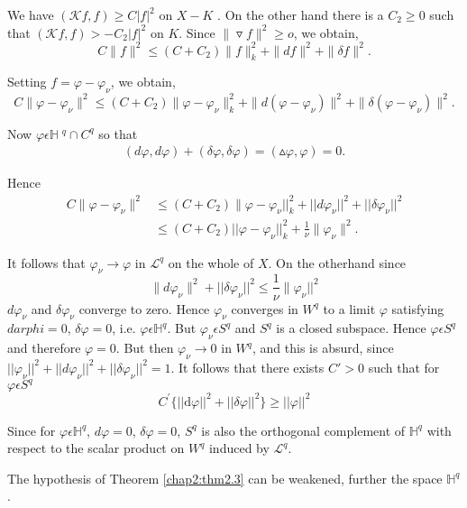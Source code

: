 We have $(\mathcal{K} f,f) \geq C | f|^2$ on $X-K$ . On the
other hand there is a $C_2 \geq 0$ such that $(\mathcal{K}
f,f)>-C_2| f|^2$ on $K$. Since $\| \triangledown f \|^2 \geq o$, we obtain, 
$$
C\| f\|^2 \leq (C+C_2)\| f \|^2_{k}+\| df\|^2 + \| \delta f\|^2.
$$

Setting $f = \varphi - \varphi_\nu$, we obtain,
$$
C\|\varphi-\varphi_\nu\|^2 \leq
(C+C_2)\|\varphi-\varphi_\nu\|^2_{k}+\|d(\varphi-\varphi_\nu)\|^2 + \|
\delta(\varphi-\varphi_\nu)\|^2 .
$$
 
Now $\varphi \epsilon \mathbb{H} \;{}^q\cap C^q$ so that  
\begin{gather*}
  (d \varphi, d\varphi) + (\delta \varphi,\delta
  \varphi)=(\vartriangle \varphi,\varphi)=0.
\end{gather*}

Hence
\begin{align*}
  C\|\varphi-\varphi_\nu\|^2 &\leq(C+C_2)\|\varphi-\varphi_\nu||^2_k
  +|| d \varphi_\nu ||^2 + || \delta \varphi_\nu ||^2 \\ 
  & \leq (C + C_2) || \varphi - \varphi_\nu||^2_{k}
  +\frac{1}{\nu}\|\varphi_\nu\|^2 . 
\end{align*}

It follows that $\varphi_\nu \rightarrow \varphi$ in $\mathcal{L}^q$ on
the whole of $X$. On the other\pageoriginale hand since
$$
\| d \varphi_\nu \|^2 + ||\delta \varphi_\nu ||^2 \leq
\frac{1}{\nu}\|\varphi_\nu||^2 
$$
$d\varphi_\nu$ and $\delta \varphi_\nu$ converge to zero. Hence
   $\varphi_\nu $ converges in $W^q$ to a limit $\varphi$ satisfying
   $d arphi=0$, $\delta\varphi=0$, i.e. $\varphi\epsilon
   \mathbb{H}^q$. But $\varphi_\nu \epsilon S^q$ and $S^q$ is a closed
   subspace. Hence $\varphi\epsilon S^q$ and therefore
   $\varphi=0$. But then $\varphi_\nu \rightarrow 0$ in $W^q$, and
   this is absurd, since $||\varphi_\nu||^2 + || d
   \varphi_\nu||^2 +||\delta \varphi_\nu||^2=1$. It follows that there
   exists $C'>0$ such that for $\varphi \epsilon S^q$ 
   $$
   C^{'}\{|| \text{d} \varphi||^2 + ||\delta \varphi||^2 \}\geq
   ||\varphi||^2
   $$

\begin{remark*}
  Since for $\varphi \epsilon \mathbb{H}^q$, $d\varphi=0$, $\delta
  \varphi = 0$, $S^q$ is also the orthogonal complement of
  $\mathbb{H}^q$ with respect to the scalar product on $W^q$ induced 
  by $\mathcal{L}^q$. 
\end{remark*}

The hypothesis of Theorem \ref{chap2:thm2.3} can be weakened, further the space
$\mathbb{H}^q$. 

